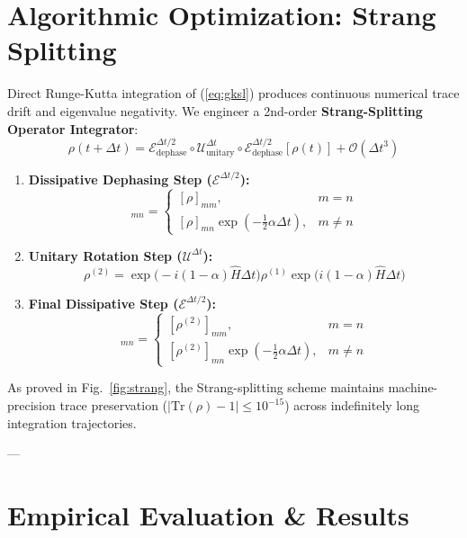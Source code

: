 \documentclass[journal,twocolumn,10pt]{IEEEtran}
\begin{document}
\section{Algorithmic Optimization: Strang Splitting}
Direct Runge-Kutta integration of (\ref{eq:gksl}) produces continuous numerical trace drift and eigenvalue negativity. We engineer a 2nd-order \textbf{Strang-Splitting Operator Integrator}:
\begin{equation}
\rho(t + \Delta t) = \mathcal{E}_{\text{dephase}}^{\Delta t/2} \circ \mathcal{U}_{\text{unitary}}^{\Delta t} \circ \mathcal{E}_{\text{dephase}}^{\Delta t/2} [\rho(t)] + \mathcal{O}(\Delta t^3)
\end{equation}
\begin{enumerate}
    \item \textbf{Dissipative Dephasing Step ($\mathcal{E}^{\Delta t/2}$):}
    \begin{equation}
    [\rho^{(1)}]_{mn} = \begin{cases} [\rho]_{mm}, & m = n \\ [\rho]_{mn} \exp\left(-\frac{1}{2}\alpha \Delta t\right), & m \neq n \end{cases}
    \end{equation}
    \item \textbf{Unitary Rotation Step ($\mathcal{U}^{\Delta t}$):}
    \begin{equation}
    \rho^{(2)} = \exp\big(-i(1-\alpha)\hat{H}\Delta t\big) \rho^{(1)} \exp\big(i(1-\alpha)\hat{H}\Delta t\big)
    \end{equation}
    \item \textbf{Final Dissipative Step ($\mathcal{E}^{\Delta t/2}$):}
    \begin{equation}
    [\rho(t+\Delta t)]_{mn} = \begin{cases} [\rho^{(2)}]_{mm}, & m = n \\ [\rho^{(2)}]_{mn} \exp\left(-\frac{1}{2}\alpha \Delta t\right), & m \neq n \end{cases}
    \end{equation}
\end{enumerate}
As proved in Fig.~\ref{fig:strang}, the Strang-splitting scheme maintains machine-precision trace preservation ($|\mathrm{Tr}(\rho)-1| \le 10^{-15}$) across indefinitely long integration trajectories.

---

\section{Empirical Evaluation \& Results}
\end{document}
